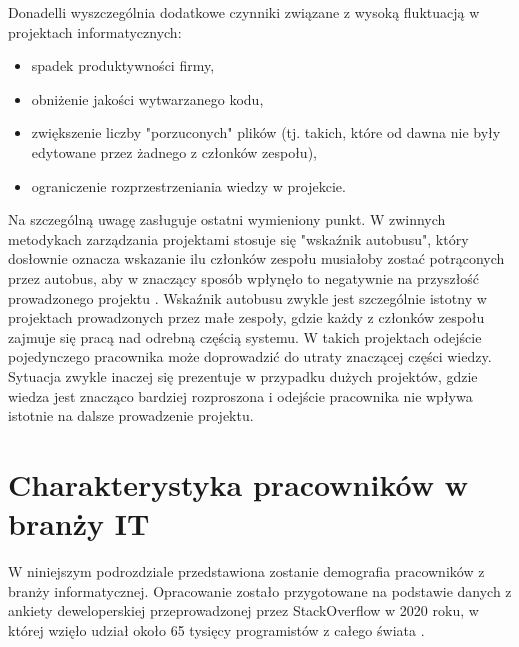 Donadelli \cite{donadelli-2015} wyszczególnia dodatkowe czynniki związane z wysoką fluktuacją w projektach informatycznych:
\begin{itemize}
    \item spadek produktywności firmy,
    \item obniżenie jakości wytwarzanego kodu,
    \item zwiększenie liczby "porzuconych" plików (tj. takich, które od dawna nie były edytowane przez żadnego z członków zespołu),
    \item ograniczenie rozprzestrzeniania wiedzy w projekcie.
\end{itemize}

Na szczególną uwagę zasługuje ostatni wymieniony punkt.
W zwinnych metodykach zarządzania projektami stosuje się "wskaźnik autobusu", który dosłownie oznacza wskazanie ilu członków zespołu musiałoby zostać potrąconych przez autobus, aby w znaczący sposób wpłynęło to negatywnie na przyszłość prowadzonego projektu \cite{truck-factor-2005}.
Wskaźnik autobusu zwykle jest szczególnie istotny w projektach prowadzonych przez małe zespoły, gdzie każdy z członków zespołu zajmuje się pracą nad odrebną częścią systemu.
W takich projektach odejście pojedynczego pracownika może doprowadzić do utraty znaczącej części wiedzy.
Sytuacja zwykle inaczej się prezentuje w przypadku dużych projektów, gdzie wiedza jest znacząco bardziej rozproszona i odejście pracownika nie wpływa istotnie na dalsze prowadzenie projektu.

%
%


%
%


\section{Charakterystyka pracowników w branży IT}

W niniejszym podrozdziale przedstawiona zostanie demografia pracowników z branży informatycznej.
Opracowanie zostało przygotowane na podstawie danych z ankiety deweloperskiej przeprowadzonej przez StackOverflow w 2020 roku, w której wzięło udział około 65 tysięcy programistów z całego świata \cite{so-survey-2020}.


